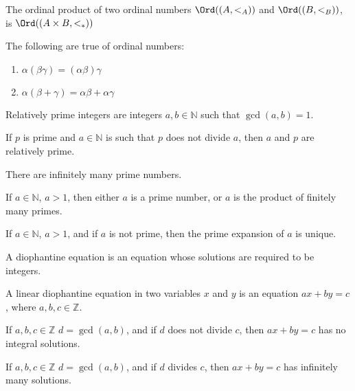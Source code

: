     \begin{definition}
        The ordinal product of two ordinal numbers
        $\Ord((A,<_{A}))$ and $\Ord((B,<_{B}))$,
        is $\Ord(({A}\times{B},<_{*}))$
    \end{definition}
    \begin{theorem}
        The following are true of ordinal numbers:
        \begin{enumerate}
            \item $\alpha(\beta\gamma)=(\alpha\beta)\gamma$
            \item $\alpha(\beta+\gamma)=\alpha\beta+\alpha\gamma$
        \end{enumerate}
    \end{theorem}
    \begin{definition}
       Relatively prime integers are integers
       $a,b\in\mathbb{N}$ such that $\gcd(a,b)=1$.
    \end{definition}
    \begin{theorem}
       If $p$ is prime and $a\in\mathbb{N}$ is
       such that $p$ does not divide $a$, then $a$ and $p$
       are relatively prime.
    \end{theorem}
    \begin{theorem}
       There are infinitely many prime numbers.
    \end{theorem}
    \begin{theorem}
       If $a\in\mathbb{N}$, $a>1$, then either
       $a$ is a prime number, or $a$ is the product
       of finitely many primes.
    \end{theorem}
    \begin{theorem}
       If $a\in\mathbb{N}$, $a>1$, and if $a$ is not
       prime, then the prime expansion of $a$ is
       unique.
    \end{theorem}
    \begin{definition}
       A diophantine equation is an equation whose
       solutions are required to be integers.
    \end{definition}
    \begin{definition}
       A linear diophantine equation in two variables
       $x$ and $y$ is an equation
       $ax+by=c$, where $a,b,c\in\mathbb{Z}$.
    \end{definition}
    \begin{theorem}
       If $a,b,c\in\mathbb{Z}$ $d=\gcd(a,b)$, and if $d$ does not
       divide $c$, then $ax+by=c$ has no integral solutions.
    \end{theorem}
    \begin{theorem}
       If $a,b,c\in\mathbb{Z}$ $d=\gcd(a,b)$, and if $d$ divides $c$,
       then $ax+by=c$ has infinitely many solutions.
    \end{theorem}